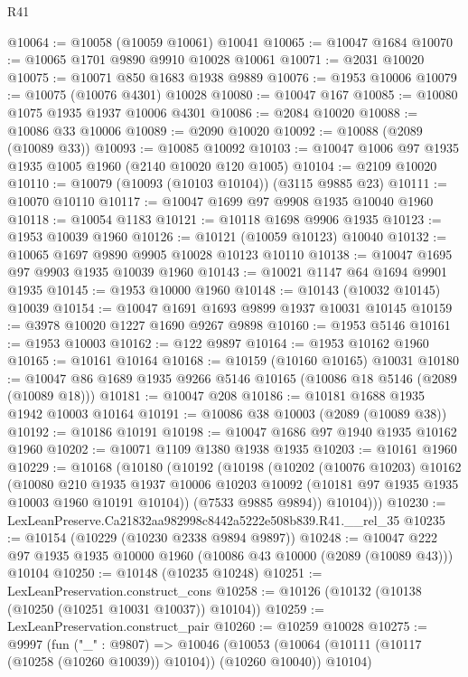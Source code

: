 \begin{lexlean}{R41}
\begin{coremodule}
@10064 := @10058 (@10059 @10061) @10041
@10065 := @10047 @1684
@10070 := @10065 @1701 @9890 @9910 @10028 @10061
@10071 := @2031 @10020
@10075 := @10071 @850 @1683 @1938 @9889
@10076 := @1953 @10006
@10079 := @10075 (@10076 @4301) @10028
@10080 := @10047 @167
@10085 := @10080 @1075 @1935 @1937 @10006 @4301
@10086 := @2084 @10020
@10088 := @10086 @33 @10006
@10089 := @2090 @10020
@10092 := @10088 (@2089 (@10089 @33))
@10093 := @10085 @10092
@10103 := @10047 @1006 @97 @1935 @1935 @1005 @1960 (@2140 @10020 @120 @1005)
@10104 := @2109 @10020
@10110 := @10079 (@10093 (@10103 @10104)) (@3115 @9885 @23)
@10111 := @10070 @10110
@10117 := @10047 @1699 @97 @9908 @1935 @10040 @1960
@10118 := @10054 @1183
@10121 := @10118 @1698 @9906 @1935
@10123 := @1953 @10039 @1960
@10126 := @10121 (@10059 @10123) @10040
@10132 := @10065 @1697 @9890 @9905 @10028 @10123 @10110
@10138 := @10047 @1695 @97 @9903 @1935 @10039 @1960
@10143 := @10021 @1147 @64 @1694 @9901 @1935
@10145 := @1953 @10000 @1960
@10148 := @10143 (@10032 @10145) @10039
@10154 := @10047 @1691 @1693 @9899 @1937 @10031 @10145
@10159 := @3978 @10020 @1227 @1690 @9267 @9898
@10160 := @1953 @5146
@10161 := @1953 @10003
@10162 := @122 @9897
@10164 := @1953 @10162 @1960
@10165 := @10161 @10164
@10168 := @10159 (@10160 @10165) @10031
@10180 := @10047 @86 @1689 @1935 @9266 @5146 @10165 (@10086 @18 @5146 (@2089 (@10089 @18)))
@10181 := @10047 @208
@10186 := @10181 @1688 @1935 @1942 @10003 @10164
@10191 := @10086 @38 @10003 (@2089 (@10089 @38))
@10192 := @10186 @10191
@10198 := @10047 @1686 @97 @1940 @1935 @10162 @1960
@10202 := @10071 @1109 @1380 @1938 @1935
@10203 := @10161 @1960
@10229 := @10168
    (@10180
      (@10192
        (@10198
          (@10202
            (@10076 @10203)
            @10162
            (@10080
              @210
              @1935
              @1937
              @10006
              @10203
              @10092
              (@10181 @97 @1935 @1935 @10003 @1960 @10191 @10104))
            (@7533 @9885 @9894))
          @10104)))
@10230 := LexLeanPreserve.Ca21832aa982998c8442a5222e508b839.R41.__rel_35
@10235 := @10154 (@10229 (@10230 @2338 @9894 @9897))
@10248 := @10047 @222 @97 @1935 @1935 @10000 @1960 (@10086 @43 @10000 (@2089 (@10089 @43))) @10104
@10250 := @10148 (@10235 @10248)
@10251 := LexLeanPreservation.construct_cons
@10258 := @10126 (@10132 (@10138 (@10250 (@10251 @10031 @10037)) @10104))
@10259 := LexLeanPreservation.construct_pair
@10260 := @10259 @10028
@10275 := @9997
    (fun ("_" : @9807) =>
    @10046
      (@10053 (@10064 (@10111 (@10117 (@10258 (@10260 @10039)) @10104)) (@10260 @10040)) @10104)

\end{coremodule}
\end{lexlean}
